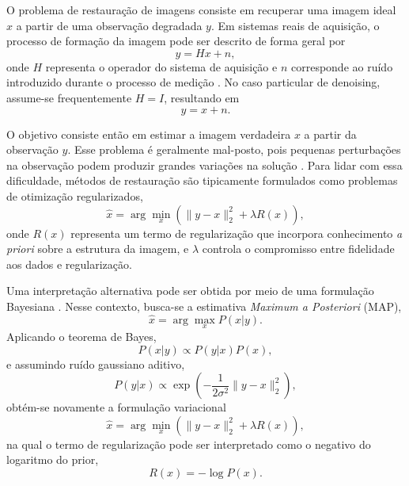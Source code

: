 \documentclass[
        oneside,      %
        english,			
        brazil			 
        ]{abntbibufjf}
\begin{document}
O problema de restauração de imagens consiste em recuperar uma imagem ideal $x$ a partir de uma observação degradada $y$. Em sistemas reais de aquisição, o processo de formação da imagem pode ser descrito de forma geral por
\begin{equation}
y = Hx + n,
\end{equation}
onde $H$ representa o operador do sistema de aquisição e $n$ corresponde ao ruído introduzido durante o processo de medição \cite{bertero1998inverse}. No caso particular de denoising, assume-se frequentemente $H = I$, resultando em
\begin{equation}
y = x + n.
\end{equation}

O objetivo consiste então em estimar a imagem verdadeira $x$ a partir da observação $y$. Esse problema é geralmente mal-posto, pois pequenas perturbações na observação podem produzir grandes variações na solução \cite{hadamard1902problemes}. Para lidar com essa dificuldade, métodos de restauração são tipicamente formulados como problemas de otimização regularizados,
\begin{equation}
\hat{x}
=
\arg\min_x
\left(
\|y-x\|_2^2 + \lambda R(x)
\right),
\end{equation}
onde $R(x)$ representa um termo de regularização que incorpora conhecimento \textit{a priori} sobre a estrutura da imagem, e $\lambda$ controla o compromisso entre fidelidade aos dados e regularização.

Uma interpretação alternativa pode ser obtida por meio de uma formulação Bayesiana \cite{jaynes2003probability}. Nesse contexto, busca-se a estimativa \textit{Maximum a Posteriori} (MAP),
\begin{equation}
\hat{x} = \arg\max_x P(x|y).
\end{equation}
Aplicando o teorema de Bayes,
\begin{equation}
P(x|y) \propto P(y|x)P(x),
\end{equation}
e assumindo ruído gaussiano aditivo,
\begin{equation}
P(y|x) \propto
\exp\left(-\frac{1}{2\sigma^2}\|y-x\|_2^2\right),
\end{equation}
obtém-se novamente a formulação variacional
\begin{equation}
\hat{x}
=
\arg\min_x
\left(
\|y-x\|_2^2 + \lambda R(x)
\right),
\end{equation}
na qual o termo de regularização pode ser interpretado como o negativo do logaritmo do prior,
\begin{equation}
R(x) = -\log P(x).
\end{equation}
\end{document}
